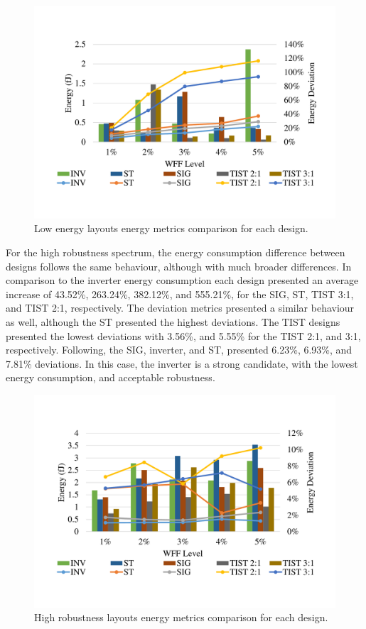 \documentclass[pgmicro,mestrado,english]{iiufrgs}
\begin{document}
    \begin{figure}[]
        \centering
            \includegraphics[width=1\textwidth, trim={1.25cm 3cm 2cm 3cm}, clip]{compLowEnergy.pdf}
            \caption{Low energy layouts energy metrics comparison for each design.}
        \label{figCompLowEnergy}
    \end{figure}

    For the high robustness spectrum, the energy consumption difference between designs follows the same behaviour, although with much broader differences. In comparison to the inverter energy consumption each design presented an average increase of 43.52\%, 263.24\%, 382.12\%, and 555.21\%, for the SIG, ST, TIST 3:1, and TIST 2:1, respectively. The deviation metrics presented a similar behaviour as well, although the ST presented the highest deviations. The TIST designs presented the lowest deviations with 3.56\%, and 5.55\% for the TIST 2:1, and 3:1, respectively. Following, the SIG, inverter, and ST, presented 6.23\%, 6.93\%, and 7.81\% deviations. In this case, the inverter is a strong candidate, with the lowest energy consumption, and acceptable robustness.

    \begin{figure}[]
        \centering
            \includegraphics[width=1\textwidth, trim={1.25cm 3cm 2cm 3cm}, clip]{compHighRobustness.pdf}
            \caption{High robustness layouts energy metrics comparison for each design.}
        \label{figCompHighRobustness}
    \end{figure}
\end{document}

